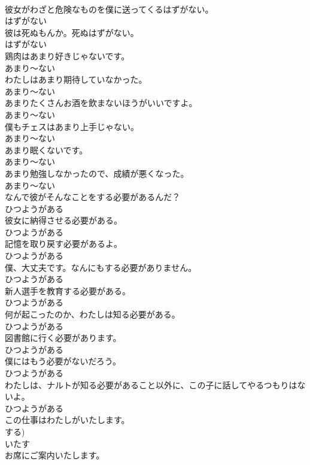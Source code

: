 \documentclass[8pt]{extreport}
\begin{document}
\begin{CJK}{UTF8}{min}
\\	彼女がわざと危険なものを僕に送ってくるはずがない。	
\\	はずがない
\\	彼は死ぬもんか。死ぬはずがない。	
\\	はずがない
\\	鶏肉はあまり好きじゃないです。	
\\	あまり～ない
\\	わたしはあまり期待していなかった。	
\\	あまり～ない
\\	あまりたくさんお酒を飲まないほうがいいですよ。	
\\	あまり～ない
\\	僕もチェスはあまり上手じゃない。	
\\	あまり～ない
\\	あまり眠くないです。	
\\	あまり～ない
\\	あまり勉強しなかったので、成績が悪くなった。	
\\	あまり～ない
\\	なんで彼がそんなことをする必要があるんだ？	
\\	ひつようがある
\\	彼女に納得させる必要がある。	
\\	ひつようがある
\\	記憶を取り戻す必要があるよ。	
\\	ひつようがある
\\	僕、大丈夫です。なんにもする必要がありません。	
\\	ひつようがある
\\	新人選手を教育する必要がある。	
\\	ひつようがある
\\	何が起こったのか、わたしは知る必要がある。	
\\	ひつようがある
\\	図書館に行く必要があります。	
\\	ひつようがある
\\	僕にはもう必要がないだろう。	
\\	ひつようがある
\\	わたしは、ナルトが知る必要があること以外に、この子に話してやるつもりはないよ。	
\\	ひつようがある
\\	この仕事はわたしがいたします。	
\\	する)	
\\	いたす
\\	お席にご案内いたします。	

\end{CJK}
\end{document}
